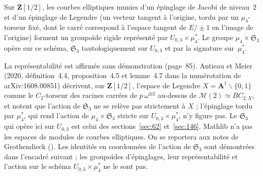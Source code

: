 \begin{encadre}
\begin{theoreme*}\nonverifie
Sur $\mathbf Z[1/2]$, les courbes elliptiques munies d'un épinglage de Jacobi de niveau~$2$ et d'un épinglage de Legendre (un vecteur tangent à l'origine, tordu par un $\mu_4$-torseur fixé, dont le carré correspond à l'espace tangent de $E/\pm1$ en l'image de l'origine) forment un groupoïde rigide représenté par $U_{0,3} \times \mu_4^*$. Le groupe $\mu_4 \times \mathfrak S_3$ opère sur ce schéma, $\mathfrak S_3$ tautologiquement sur $U_{0,3}$ et par la signature sur~$\mu_4^*$.
\end{theoreme*}
\end{encadre}
{\small La représentabilité est affirmée sans démonstration (page~85). Antieau et Meier (2020, définition~4.4, proposition~4.5 et lemme~4.7 dans la numérotation de arXiv:1608.00851) décrivent, sur $\mathbf Z[1/2]$, l'espace de Legendre $X = \mathbf A^1 \smallsetminus \{0, 1\}$ comme le $C_2$-torseur des racines carrées de $p\,\omega^{\otimes 2}$ au-dessus de $\mathcal M(2) \simeq BC_{2,X}$, et notent que l'action de $\mathfrak S_3$ ne se relève pas strictement à $X$ ; l'épinglage tordu par $\mu_4^*$, qui rend l'action de $\mu_4 \times \mathfrak S_3$ stricte sur $U_{0,3} \times \mu_4^*$, n'y figure pas. Le $\mathfrak S_3$ qui opère ici sur $U_{0,3}$ est celui des sections~\ref{sec:62} et~\ref{sec:146}. Mathlib n'a pas les espaces de modules de courbes elliptiques. On se reportera aux notes de Grothendieck (). Les identités en coordonnées de l'action de $\mathfrak S_3$ sont démontrées dans l'encadré suivant ; les groupoïdes d'épinglages, leur représentabilité et l'action sur le schéma $U_{0,3} \times \mu_4^*$ ne le sont pas.\par}

